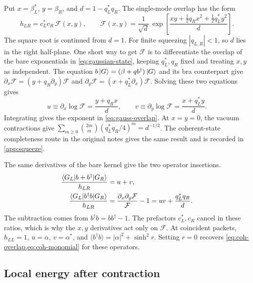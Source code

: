 \documentclass[../../main.tex]{subfiles}
\begin{document}
Put \(x=\beta_L^*\), \(y=\beta_R\), and \(d=1-q_L^*q_R\).
The single-mode overlap has the form
\begin{equation}
 h_{LR}=c_L^*c_R\,\mathcal{F}(x,y),\qquad
 \mathcal{F}(x,y)=\frac{1}{\sqrt{d}}\,
 \exp\!\left[\frac{xy+\tfrac12 q_R x^2+\tfrac12 q_L^*y^2}{d}\right].
 \label{eq:gauss-overlap}
\end{equation}
The square root is continued from \(d=1\). For finite squeezing
\(|q_{L,R}|<1\), so \(d\) lies in the right half-plane. One short way to get
\(\mathcal{F}\) is to differentiate the overlap of the bare exponentials
in \cref{eq:gaussian-state}, keeping \(q_L^*,q_R\) fixed and treating \(x,y\)
as independent. The equation \(b\left\lvert G \right\rangle=(\beta+qb^\dagger)\left\lvert G \right\rangle\) and
its bra counterpart give
\(\partial_x\mathcal{F}=(y+q_R\partial_y)\mathcal{F}\) and
\(\partial_y\mathcal{F}=(x+q_L^*\partial_x)\mathcal{F}\).
Solving these two equations gives
\begin{equation}
 u\equiv\partial_x\log\mathcal{F}=\frac{y+q_Rx}{d},\qquad
 v\equiv\partial_y\log\mathcal{F}=\frac{x+q_L^*y}{d}.
 \label{eq:uv}
\end{equation}
Integrating gives the exponent in \cref{eq:gauss-overlap}.
At \(x=y=0\), the vacuum contractions give
\(\sum_{m\ge 0}\binom{2m}{m}(q_L^*q_R/4)^m=d^{-1/2}\).
The coherent-state completeness route in the original notes gives the
same result and is recorded in \cref{app:squeeze}.

The same derivatives of the bare kernel give the two operator insertions.
\begin{align}
 \frac{\langle G_L\rvert b+b^\dagger\lvert G_R\rangle}{h_{LR}} &= u+v,\\
 \frac{\langle G_L\rvert b^\dagger b\lvert G_R\rangle}{h_{LR}}
    &=\frac{\partial_x\partial_y\mathcal{F}}{\mathcal{F}}-1
      =uv+\frac{q_L^*q_R}{d}.
 \label{eq:transition-moments}
\end{align}
The subtraction comes from \(b^\dagger b=bb^\dagger-1\).
The prefactors \(c_L^*,c_R\) cancel in these ratios, which is why the
\(x,y\) derivatives act only on \(\mathcal{F}\).
At coincident packets, \(h_{LL}=1\), \(u=\alpha\), \(v=\alpha^*\), and
\(\langle b^\dagger b\rangle=|\alpha|^2+\sinh^2 r\).
Setting \(r=0\) recovers \cref{eq:coh-overlap,eq:coh-monomial} for these
operators.

\subsection{Local energy after contraction}
\label{sec:energy}
\end{document}

